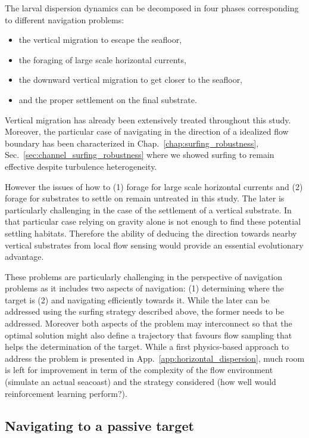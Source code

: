 The larval dispersion dynamics can be decomposed in four phases corresponding to different navigation problems:
\begin{itemize}
	\item the vertical migration to escape the seafloor,
	\item the foraging of large scale horizontal currents,
	\item the downward vertical migration to get closer to the seafloor,
	\item and the proper settlement on the final substrate.
\end{itemize}
Vertical migration has already been extensively treated throughout this study.
Moreover, the particular case of navigating in the direction of a idealized flow boundary has been characterized in Chap.~\ref{chap:surfing_robustness}, Sec.~\ref{sec:channel_surfing_robustness} where we showed surfing to remain effective despite turbulence heterogeneity.

However the issues of how to (1) forage for large scale horizontal currents and (2) forage for substrates to settle on remain untreated in this study.
The later is particularly challenging in the case of the settlement of a vertical substrate.
In that particular case relying on gravity alone is not enough to find these potential settling habitats.
Therefore the ability of deducing the direction towards nearby vertical substrates from local flow sensing would provide an essential evolutionary advantage.

These problems are particularly challenging in the perspective of navigation problems as it includes two aspects of navigation: (1) determining where the target is (2) and navigating efficiently towards it.
While the later can be addressed using the surfing strategy described above, the former needs to be addressed.
Moreover both aspects of the problem may interconnect so that the optimal solution might also define a trajectory that favours flow sampling that helps the determination of the target.
While a first physics-based approach to address the problem is presented in App.~\ref{app:horizontal_dispersion}, much room is left for improvement in term of the complexity of the flow environment (simulate an actual seacoast) and the strategy considered (how well would reinforcement learning perform?).

\subsection{Navigating to a passive target}\label{sec:navigating_passive_target}

